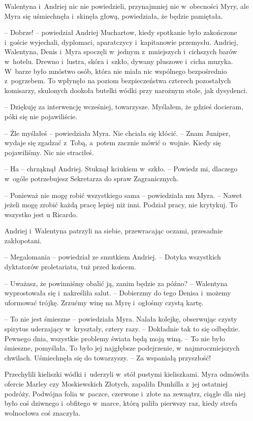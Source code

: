 \documentclass[oneside,polish,11pt,sfheadings]{mwbk}
\begin{document}
Walentyna i~Andriej nic nie powiedzieli, przynajmniej nie w~obecności
Myry, ale Myra się uśmiechnęła i~skinęła głową, powiedziała, że będzie
pamiętała.

-- Dobrze! -- powiedział Andriej Muchartow, kiedy spotkanie było
zakończone i~goście wyjechali, dyplomaci, aparatczycy i~kapitanowie
przemysłu. Andriej, Walentyna, Denis i~Myra spoczęli w~jednym z~mniejszych i~cichszych barów w~hotelu. Drewno i~lustra, skóra i~szkło,
dywany pluszowe i~cicha muzyka. W~barze było mnóstwo osób, która nie
miała nic wspólnego bezpośrednio z~pogrzebem. To wpłynęło na poziom
bezpieczeństwa czterech pozostałych komisarzy, skulonych dookoła butelki
wódki przy narożnym stole, jak dysydenci. 

-- Dziękuję za interwencję
wcześniej, towarzysze. Myślałem, że gdzieś docieram, póki się nie
pojawiliście.

-- Źle myślałeś -- powiedziała Myra. Nie chciała się kłócić. -- Znam
Juniper, wydaje się zgadzać z~Tobą, a~potem zacznie mówić o~wojnie.
Kiedy się pojawiliśmy. Nic nie straciłeś.

-- Ha -- chrząknął Andriej. Stuknął kciukiem w~szkło. -- Powiedz mi,
dlaczego w~ogóle potrzebujesz Sekretarza do spraw Zagranicznych.

-- Ponieważ nie mogę robić wszystkiego sama -- powiedziała mu Myra. -- Nawet jeżeli mogę zrobić każdą pracę lepiej niż inni. Podział pracy, nie
krytykuj. To wszystko jest u Ricardo.

Andriej i~Walentyna patrzyli na siebie, przewracając oczami, przesadnie
zakłopotani.

-- Megalomania -- powiedział ze smutkiem Andriej. -- Dotyka wszystkich
dyktatorów proletariatu, tuż przed końcem.

-- Uważasz, że powinniśmy obalić ją, zanim będzie za późno? -- Walentyna
wyprostowała się i~nakreśliła salut. -- Dobierzmy do tego Denisa i~możemy
uformować trójkę. Zrzućmy winę na Myrę i~ogłośmy czystą kartę.

-- To nie jest śmieszne -- powiedziała Myra. Nalała kolejkę, obserwując
czysty spirytus uderzający w~kryształy, cztery razy. -- Dokładnie tak
to się odbędzie. Pewnego dnia, wszystkie problemy świata będą moją winą.
-- To nie było śmieszne, pomyślała. To było jej najgłębsze podejrzenie, w~najmroczniejszych chwilach. Uśmiechnęła się do towarzyszy. -- Za
wspaniałą przyszłość!

Przechylili kieliszki wódki i~uderzyli w~stół pustymi kieliszkami. Myra
odmówiła ofercie Marley czy Moskiewskich Złotych, zapaliła Dunhilla z~jej ostatniej podróży. Podwójna folia w~paczce, czerwone i~złote na
zewnątrz, ciągle dla niej było coś dziwnego i~obfitego w~marce, którą
paliła pierwszy raz, kiedy strefa wolnocłowa coś znaczyła.
\end{document}
